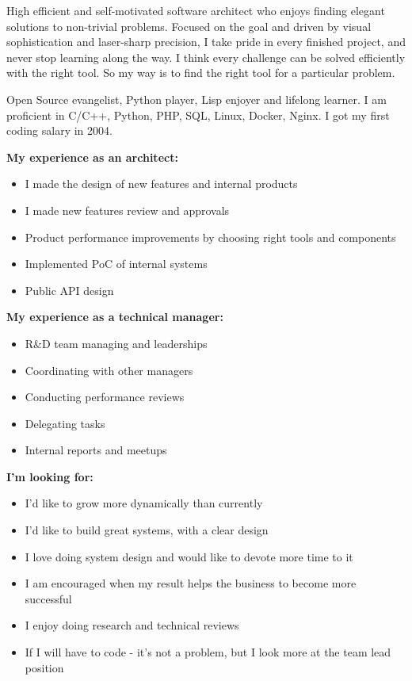 
\begin{cvparagraph}

High efficient and self-motivated software architect who enjoys finding elegant
solutions to non-trivial problems. Focused on the goal and driven by visual
sophistication and laser-sharp precision, I take pride in every finished
project, and never stop learning along the way. I think every challenge can be
solved efficiently with the right tool. So my way is to find the right tool for
a particular problem.

Open Source evangelist, Python player, Lisp enjoyer and lifelong learner.
I am proficient in C/C++, Python, PHP, SQL, Linux, Docker, Nginx. I got my
first coding salary in 2004.

\textbf{My experience as an architect:}

\begin{itemize}
    \item I made the design of new features and internal products
    \item I made new features review and approvals
    \item Product performance improvements by choosing right tools and components
    \item Implemented PoC of internal systems
    \item Public API design
\end{itemize}

\textbf{My experience as a technical manager:}

\begin{itemize}
    \item R\&D team managing and leaderships
    \item Coordinating with other managers
    \item Conducting performance reviews
    \item Delegating tasks
    \item Internal reports and meetups
\end{itemize}

\textbf{I'm looking for:}

\begin{itemize}
    \item I'd like to grow more dynamically than currently
    \item I'd like  to build great systems, with a clear design
    \item I love doing system design and would like to devote more time to it
    \item I am encouraged when my result helps the business to become more successful
    \item I enjoy doing research and technical reviews
    \item If I will have to code - it's not a problem, but I look more at the team lead position
\end{itemize}

\end{cvparagraph}
